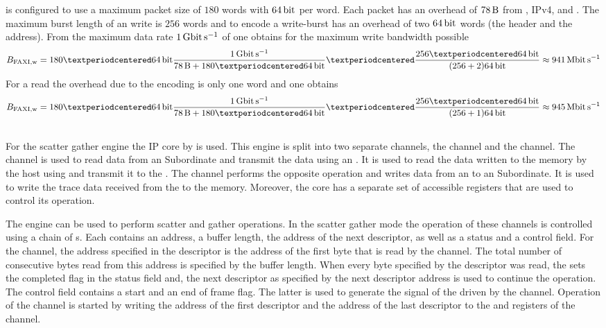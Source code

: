 \HostARQ{} is configured to use a maximum packet size of $\num{180}$ words with $\PhyWordSize{}$ per word.
Each packet has an overhead of $\SI{78}{\byte}$ from \Gigabitethernet{}, IPv4, \UDP{} and \HostARQ{}.
The maximum burst length of an \AXI{} write is $\num{256}$ words and to encode a write-burst \FAXI{} has an overhead of two $\PhyWordSize{}$ words (the header and the address). From the maximum data rate $\SI{1}{\giga\bit\per\second}$ of \Gigabitethernet{} one obtains for the maximum write bandwidth possible
\[
B_{\text{\FAXI{},w}} = \num{180} · \PhyWordSize{} \frac{\SI{1}{\giga\bit\per\second}}{\SI{78}{\byte} + 180 · \PhyWordSize{}} · \frac{256 · \PhyWordSize{}}{(256 + 2) \PhyWordSize{}} \approx \SI{941}{\mega\bit\per\second}
\]
For a read the overhead due to the \FAXI{} encoding is only one \PhyWordSize{} word and one obtains
\[
B_{\text{\FAXI{},w}} = \num{180} · \PhyWordSize{} \frac{\SI{1}{\giga\bit\per\second}}{\SI{78}{\byte} + 180 · \PhyWordSize{}} · \frac{256 · \PhyWordSize{}}{(256 + 1) \PhyWordSize{}} \approx \SI{945}{\mega\bit\per\second}
\]


\subsection{\AXIDMA{}}\label{sec:AXIDMA}
For the scatter gather \DMA{} engine the \AXIDMA{} IP core by \Xilinx{}\autocite{ref:axidma} is used. This \DMA{} engine is split into two separate channels, the \MMToS{} channel and the \SToMM{} channel.
The \MMToS{} channel is used to read data from an \AXI{} Subordinate and transmit the data using an \AXIStream{}. It is used to read the data written to the \DDR{} memory by the host using \FAXI{} and transmit it to the \pbexec{}. The \SToMM{} channel performs the opposite operation and writes data from an \AXIStream{} to an \AXI{} Subordinate. It is used to write the trace data received from the \pbexec{} to the \DDR{} memory.
Moreover, the \AXIDMA{} core has a separate set of \AXILite{} accessible registers that are used to control its operation.

The \AXIDMA{} \DMA{} engine can be used to perform scatter and gather operations. In the scatter gather mode the operation of these channels is controlled using a chain of \descriptor{}s.
Each \descriptor{} contains an address, a buffer length, the address of the next descriptor, as well as a status and a control field. For the \MMToS{} channel, the address specified in the descriptor is the address of the first byte that is read by the channel. The total number of consecutive bytes read from this address is specified by the buffer length. When every byte specified by the descriptor was read, the \AXIDMA{} sets the completed flag in the status field and, the next descriptor as specified by the next descriptor address is used to continue the operation. The control field contains a start and an end of frame flag. The latter is used to generate the \TLAST{} signal of the \AXIStream{} driven by the \MMToS{} channel. Operation of the \MMToS{} channel is started by writing the address of the first descriptor and the address of the last descriptor to the \curdesc{} and \taildesc{} registers of the \MMToS{} channel.

